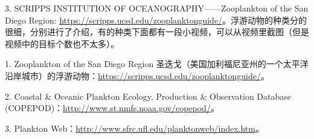 3. SCRIPPS INSTITUTION OF OCEANOGRAPHY——Zooplankton of the San Diego Region: \url{https://scripps.ucsd.edu/zooplanktonguide/}。浮游动物的种类分的很细，分别进行了介绍，有的种类下面都有一段小视频，可以从视频里截图（但是视频中的目标个数也不太多）。

{\color{red}1. Zooplankton of the San Diego Region 圣迭戈（美国加利福尼亚州的一个太平洋沿岸城市）的浮游动物：\url{https://scripps.ucsd.edu/zooplanktonguide/}。

2. Coastal \& Oceanic Plankton Ecology, Production \& Observation Database (COPEPOD)：\url{http://www.st.nmfs.noaa.gov/copepod/}。

3. Plankton Web：\url{http://www.sfrc.ufl.edu/planktonweb/index.htm}。
}



















